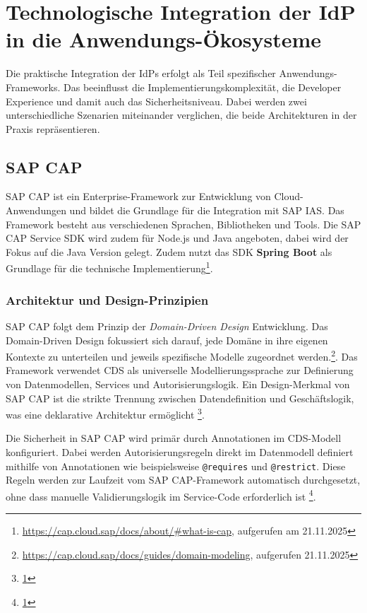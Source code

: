 \section{Technologische Integration der \ac{IdP} in die Anwendungs-Ökosysteme}
\label{sec:tech_frameworks}

Die praktische Integration der \ac{IdP}s erfolgt als Teil spezifischer Anwendungs-Frameworks. Das beeinflusst die Implementierungskomplexität, die Developer Experience und damit auch das Sicherheitsniveau. Dabei werden zwei unterschiedliche Szenarien miteinander verglichen, die beide Architekturen in der Praxis repräsentieren.

\subsection{\ac{SAP CAP}}

\ac{SAP CAP} ist ein Enterprise-Framework zur Entwicklung von Cloud-Anwendungen und bildet die Grundlage für die Integration mit \ac{SAP IAS}. Das Framework besteht aus verschiedenen Sprachen, Bibliotheken und Tools. Die \ac{SAP CAP} Service \ac{SDK} wird zudem für Node.js und Java angeboten, dabei wird der Fokus auf die Java Version gelegt. Zudem nutzt das \ac{SDK} \textbf{Spring Boot} als Grundlage für die technische Implementierung\footnote{\label{fn:sapcap}\url{https://cap.cloud.sap/docs/about/\#what-is-cap}, aufgerufen am 21.11.2025}.

\subsubsection{Architektur und Design-Prinzipien}

\ac{SAP CAP} folgt dem Prinzip der \textit{Domain-Driven Design} Entwicklung. Das Domain-Driven Design fokussiert sich darauf, jede Domäne in ihre eigenen Kontexte zu unterteilen und jeweils spezifische Modelle zugeordnet werden.\footnote{\url{https://cap.cloud.sap/docs/guides/domain-modeling}, aufgerufen 21.11.2025}. Das Framework verwendet \ac{CDS} als universelle Modellierungssprache zur Definierung von Datenmodellen, Services und Autorisierungslogik. Ein Design-Merkmal von \ac{SAP CAP} ist die strikte Trennung zwischen Datendefinition und Geschäftslogik, was eine deklarative Architektur ermöglicht \footnote{\ref{fn:sapcap}}.

Die Sicherheit in \ac{SAP CAP} wird primär durch Annotationen im \ac{CDS}-Modell konfiguriert. Dabei werden Autorisierungsregeln direkt im Datenmodell definiert mithilfe von Annotationen wie beispielsweise \texttt{@requires} und \texttt{@restrict}. Diese Regeln werden zur Laufzeit vom \ac{SAP CAP}-Framework automatisch durchgesetzt, ohne dass manuelle Validierungslogik im Service-Code erforderlich ist \footnote{\ref{fn:sapcap}}.

